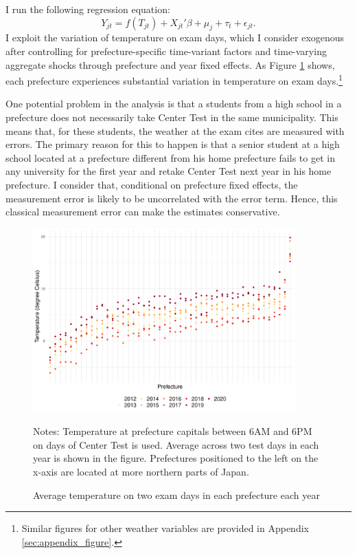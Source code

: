 \documentclass[12pt,letterpaper]{article}
\begin{document}
I run the following regression equation:
\begin{equation*}
  Y_{jt} = f(T_{jt}) + X_{jt}' \beta + \mu_j + \tau_t + \epsilon_{jt}.
\end{equation*}
I exploit the variation of temperature on exam days, which I consider exogenous after controlling for prefecture-specific time-variant factors and time-varying aggregate shocks through prefecture and year fixed effects.
As Figure \ref{fig:temperature_diff} shows, each prefecture experiences substantial variation in temperature on exam days.\footnote{
  Similar figures for other weather variables are provided in Appendix \ref{sec:appendix_figure}.
}

One potential problem in the analysis is that a students from a high school in a prefecture does not necessarily take Center Test in the same municipality.
This means that, for these students, the weather at the exam cites are measured with errors.
The primary reason for this to happen is that a senior student at a high school located at a prefecture different from his home prefecture fails to get in any university for the first year and retake Center Test next year in his home prefecture.
I consider that, conditional on prefecture fixed effects, the measurement error is likely to be uncorrelated with the error term.
Hence, this classical measurement error can make the estimates conservative.

\begin{figure}[H]
  \centering
  \caption{Average temperature on two exam days in each prefecture each year}
  \includegraphics[width = 0.9\textwidth]{../Output/images/temperature_diff.pdf}
  \label{fig:temperature_diff}
  \footnotesize
  \begin{tablenotes}
    \item Notes:
      Temperature at prefecture capitals between 6AM and 6PM on days of Center Test is used.
      Average across two test days in each year is shown in the figure.
      Prefectures positioned to the left on the x-axis are located at more northern parts of Japan.
  \end{tablenotes}
\end{figure}
\end{document}
